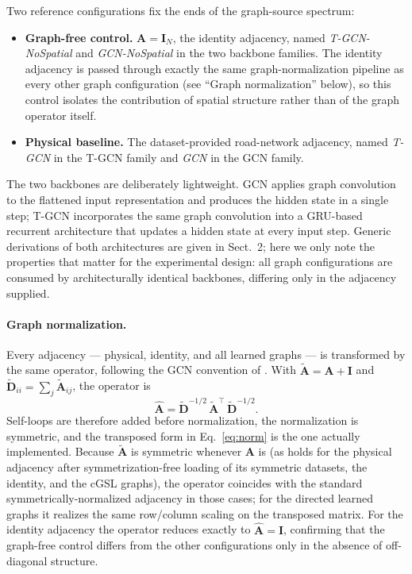 Two reference configurations fix the ends of the graph-source spectrum:

\begin{itemize}
\item \textbf{Graph-free control.} $\mathbf{A}=\mathbf{I}_N$, the identity
adjacency, named \emph{T-GCN-NoSpatial} and \emph{GCN-NoSpatial} in the two
backbone families. The identity adjacency is passed through exactly the same
graph-normalization pipeline as every other graph configuration
(see ``Graph normalization'' below), so this control isolates the contribution of
spatial structure rather than of the graph operator itself.
\item \textbf{Physical baseline.} The dataset-provided road-network adjacency,
named \emph{T-GCN} in the T-GCN family and \emph{GCN} in the GCN family.
\end{itemize}

The two backbones are deliberately lightweight. GCN applies graph convolution
to the flattened input representation and produces the hidden state in a single
step; T-GCN incorporates the same graph convolution into a GRU-based recurrent
architecture that updates a hidden state at every input step. Generic
derivations of both architectures are given in
Sect.~2; here we only note the properties that matter for
the experimental design: all graph configurations are consumed by
architecturally identical backbones, differing only in the adjacency supplied.

\paragraph{Graph normalization.}
Every adjacency --- physical, identity, and all learned graphs --- is
transformed by the same operator, following the GCN convention of
\citet{kipf2017semi}. With $\tilde{\mathbf{A}}=\mathbf{A}+\mathbf{I}$ and
$\tilde{\mathbf{D}}_{ii}=\sum_j \tilde{\mathbf{A}}_{ij}$, the operator is
\begin{equation}\label{eq:norm}
\hat{\mathbf{A}}
=\tilde{\mathbf{D}}^{-1/2}\,\tilde{\mathbf{A}}^{\top}\,\tilde{\mathbf{D}}^{-1/2}.
\end{equation}
Self-loops are therefore added before normalization, the normalization is
symmetric, and the transposed form in Eq.~\eqref{eq:norm} is the one actually
implemented. Because $\tilde{\mathbf{A}}$ is symmetric whenever $\mathbf{A}$ is
(as holds for the physical adjacency after symmetrization-free loading of its
symmetric datasets, the identity, and the cGSL graphs), the operator coincides
with the standard symmetrically-normalized adjacency in those cases; for the
directed learned graphs it realizes the same row/column scaling on the
transposed matrix. For the identity adjacency the operator reduces exactly to
$\hat{\mathbf{A}}=\mathbf{I}$, confirming that the graph-free control differs
from the other configurations only in the absence of off-diagonal structure.

